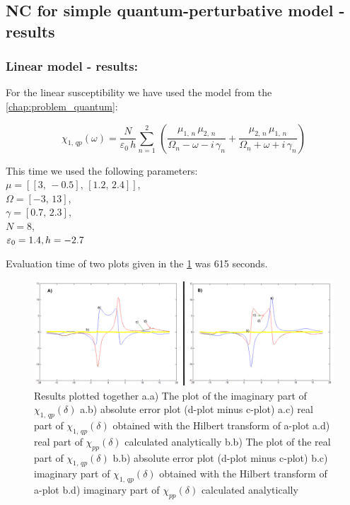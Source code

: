 \documentclass[12pt,twoside,a4paper]{article}
\numberwithin{equation}{subsection}
\numberwithin{figure}{subsection}
\begin{document}
\subsection{NC for simple quantum-perturbative model - results} \label{chap:nc_quantum}

\subsubsection*{Linear model - results:}

For the linear susceptibility we have used the model from the \ref{chap:problem_quantum}: 

\begin{equation} \label{eq:nclin_chipp}
  {\chi_{1, \,qp}}(\omega ) = \frac {N}{\varepsilon_0\,h} \sum_{n=1}^{2}\,(\frac {{\mu_{1, \,n}}\,{ \mu_{2, \,n}}}{{\Omega_{n}}
  - \omega  - i\,{\gamma_{n}}} + \frac {{\mu_{2, \,n}}\,{\mu_{1, \,n}}}{{\Omega_{n}} + \omega + i\,{\gamma_{n}}})
\end{equation}

This time we used the following parameters: \\
$\mu = [[3, \, - 0.5], \,[1.2, \,2.4]]$, \\ 
$\Omega =[ - 3, \,13]$, \\
$\gamma =[0.7, \,2.3]$, \\ 
$N=8$, \\ 
${\varepsilon_{0}}=1.4, \\
h= - 2.7$

Evaluation time of two plots given in the \ref{fig:nc_qp1} was 615 seconds.

\begin{figure}
  \includegraphics[width=150mm]{img/nc_qp1.png}
  \caption{Results plotted together 
    a.a) The plot of the imaginary part of ${\chi_{1, \,qp}}(\delta )$
    a.b) absolute error plot (d-plot minus c-plot) 
    a.c) real part of ${\chi_{1, \,qp}}(\delta )$ obtained with the Hilbert transform of a-plot 
    a.d) real part of ${\chi_{pp}}(\delta )$ calculated analytically 
    b.b) The plot of the real part of ${\chi_{1, \,qp}}(\delta )$ 
    b.b) absolute error plot (d-plot minus c-plot) 
    b.c) imaginary part of ${\chi_{1, \,qp}}(\delta )$ obtained with the Hilbert transform of a-plot 
    b.d) imaginary part of ${\chi_{pp}}(\delta )$ calculated analytically  
    \label{fig:nc_qp1}
  }
\end{figure}
\end{document}
